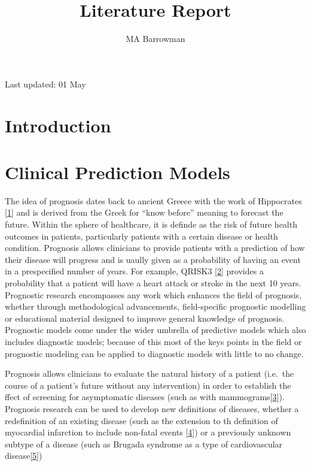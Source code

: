 \documentclass[
]{article}
\title{Literature Report}
\author{MA Barrowman}
\date{}
\begin{document}
\maketitle

{
\setcounter{tocdepth}{2}
\tableofcontents
}
Last updated: 01 May

\hypertarget{introduction}{%
\section{Introduction}\label{introduction}}

\hypertarget{clinical-prediction-models}{%
\section{Clinical Prediction Models}\label{clinical-prediction-models}}

The idea of prognosis dates back to ancient Greece with the work of Hippocrates {[}\protect\hyperlink{ref-hippocrates_genuine_1886}{1}{]} and is derived from the Greek for ``know before'' meaning to forecast the future. Within the sphere of healthcare, it is definde as the risk of future health outcomes in patients, particularly patients with a certain disease or health condition. Prognosis allows clinicians to provide patients with a prediction of how their disease will progress and is uaully given as a probability of having an event in a prespecified number of years. For example, QRISK3 {[}\protect\hyperlink{ref-hippisley-cox_development_2017}{2}{]} provides a probability that a patient will have a heart attack or stroke in the next 10 years. Prognostic research encompasses any work which enhances the field of prognosis, whether through methodological advancements, field-specific prognostic modelling or educational material designed to improve general knowledge of prognosis. Prognostic models come under the wider umbrella of predictive models which also includes diagnostic models; because of this most of the keys points in the field or prognostic modeling can be applied to diagnostic models with little to no change.

Prognosis allows clinicians to evaluate the natural history of a patient (i.e.~the course of a patient's future without any intervention) in order to establish the ffect of screening for asymptomatic diseases (such as with mammograms{[}\protect\hyperlink{ref-hemingway_prognosis_2013}{3}{]}). Prognosis research can be used to develop new definitions of diseases, whether a redefinition of an existing disease (such as the extension to th definition of myocardial infarction to include non-fatal events {[}\protect\hyperlink{ref-thygesen_universal_2007}{4}{]}) or a previously unknown subtype of a disease (such as Brugada syndrome as a type of cardiovascular disease{[}\protect\hyperlink{ref-probst_long-term_2010}{5}{]})
\end{document}
